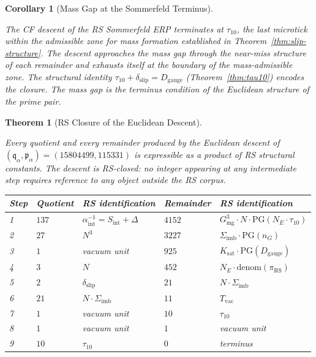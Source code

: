 \documentclass[11pt, letterpaper]{article}
\newcommand{\Dg}{D_{\mathrm{gauge}}}
\newcommand{\Sint}{S_{\mathrm{int}}}
\newcommand{\Sigimb}{\Sigma_{\mathrm{imb}}}
\newcommand{\PG}{\mathrm{PG}}
\newcommand{\Gmg}{G_{\mathrm{mg}}}
\newcommand{\Ksat}{K_{\mathrm{sat}}}
\newcommand{\dslip}{\delta_{\mathrm{slip}}}
\newcommand{\Tvac}{T_{\mathrm{vac}}}
\newcommand{\tauX}{\tau_{10}}
\newcommand{\nG}{n_G}
\newcommand{\aSC}{\alpha^{-1}_{\mathrm{int}}}
\newcommand{\piRS}{\pi_{\mathrm{RS}}}
\newcommand{\pa}{\mathfrak{p}_\alpha}
\newcommand{\qa}{\mathfrak{q}_\alpha}
\theoremstyle{definition}
\theoremstyle{plain}
\newtheorem{theorem}{Theorem}[section]
\newtheorem{corollary}{Corollary}[section]
\begin{document}
\begin{corollary}[Mass Gap at the Sommerfeld Terminus]
\label{cor:massgap-sommerfeld}
\begin{rsbox}
The CF descent of the RS Sommerfeld ERP terminates at $\tauX$, the last
microtick within the admissible zone for mass formation established in
Theorem~\ref{thm:slip-structure}.  The descent approaches the mass gap through
the near-miss structure of each remainder and exhausts itself at the boundary
of the mass-admissible zone.  The structural identity
$\tauX+\dslip=\Dg$ (Theorem~\ref{thm:tau10}) encodes the closure.  The mass
gap is the terminus condition of the Euclidean structure of the prime pair.
\end{rsbox}
\end{corollary}

\begin{theorem}[RS Closure of the Euclidean Descent]
\label{thm:descent-closed}
\begin{rsbox}
Every quotient and every remainder produced by the Euclidean descent of
$(\qa,\pa)=(15804499,115331)$ is expressible as a product of RS structural
constants.  The descent is RS-closed: no integer appearing at any
intermediate step requires reference to any object outside the RS corpus.

\begin{center}
\small
\begin{tabular}{lllll}
\toprule
Step & Quotient & RS identification & Remainder & RS identification \\
\midrule
1 & $137$ & $\aSC=\Sint+\Delta$
  & $4152$ & $\Gmg^3\cdot N\cdot\PG(N_E\cdot\tauX)$ \\
2 & $27$ & $N^3$
  & $3227$ & $\Sigimb\cdot\PG(\nG)$ \\
3 & $1$ & vacuum unit
  & $925$ & $\Ksat\cdot\PG(\Dg)$ \\
4 & $3$ & $N$
  & $452$ & $N_E\cdot\mathrm{denom}(\piRS)$ \\
5 & $2$ & $\dslip$
  & $21$ & $N\cdot\Sigimb$ \\
6 & $21$ & $N\cdot\Sigimb$
  & $11$ & $\Tvac$ \\
7 & $1$ & vacuum unit
  & $10$ & $\tauX$ \\
8 & $1$ & vacuum unit
  & $1$ & vacuum unit \\
9 & $10$ & $\tauX$
  & $0$ & terminus \\
\bottomrule
\end{tabular}
\end{center}


\end{rsbox}
\end{theorem}
\end{document}
